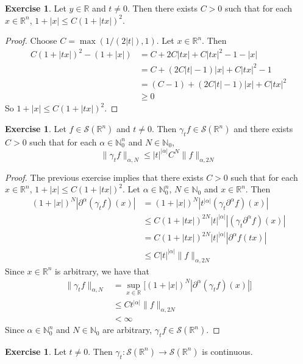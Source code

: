 \documentclass{book}
\theoremstyle{definition}
\newtheorem{ex}[definition]{Exercise}
\newcommand{\al}{\alpha}
\newcommand{\gam}{\gamma}
\newcommand{\N}{\mathbb{N}}
\newcommand{\R}{\mathbb{R}}
\newcommand{\MS}{\mathcal{S}}
\DeclareMathOperator*{\0}{\mbf{0}}
\DeclareMathOperator*{\1}{\mbf{1}}
\newcommand{\p}{\partial}
\begin{document}
	\begin{ex} Let $y \in \R$ and $t \neq 0$. Then there exists $C > 0$ such that for each $x \in \R^n$, $1+|x| \leq C(1 + |tx|)^2$.
	\end{ex}
	
	\begin{proof}
		Choose $C = \max(1/(2|t|), 1)$. Let $x \in \R^n$. Then 
		\begin{align*}
			C(1 + |tx|)^2 - (1 + |x|) 
			& = C + 2C|tx| + C|tx|^2 - 1 - |x| \\
			& = C + (2C|t| - 1)|x| + C|tx|^2 - 1 \\
			& = (C-1) + (2C|t| - 1)|x| + C|tx|^2 \\
			& \geq 0
		\end{align*}
		So $1 + |x| \leq C(1 + |tx|)^2$. 
	\end{proof}

	\begin{ex}
		Let $f \in \MS(\R^n)$ and $t \neq 0$. Then $ \gam_t f \in \MS(\R^n)$ and there exists $C > 0$ such that for each $\al \in \N_0^n$ and $N \in \N_0$, 
		$$\| \gam_t f\|_{\al, N} \leq |t|^{|\al|} C^N\|f\|_{\al, 2N}$$
	\end{ex}
	
	\begin{proof}
		The previous exercise implies that there exists $C > 0$ such that for each $x \in \R^n$, $1+|x| \leq C(1 + |tx|)^2$. Let $\al \in \N_0^n$, $N \in \N_0$ and $x \in \R^n$. Then  
		\begin{align*}
			(1+|x|)^N |\p^{\al}( \gam_t f)(x)|
			& = (1+|x|)^N |t^{|\al|} (\gam_t \p^{\al} f)(x)| \\
			& \leq C(1+|tx|)^{2N} |t|^{|\al|} |(\gam_t \p^{\al} f)(x)| \\
			& = C(1+|tx|)^{2N} |t|^{|\al|}  |\p^{\al} f(tx)| \\
			& \leq C |t|^{|\al|} \|f\|_{\al, 2N}
		\end{align*}
		Since $x \in \R^n$ is arbitrary, we have that
		\begin{align*}
			\|\gam_t f\|_{\al, N}
			& = \sup_{x \in \R} \bigg[ (1+|x|)^N |\p^{\al} (\gam_t f)(x)|\bigg] \\
			& \leq C t^{|\al|} \|f\|_{\al, 2N} \\
			& < \infty
		\end{align*}
		Since $\al \in \N_0^n$ and $N \in \N_0$ are arbitrary, $\gam_t f \in \MS(\R^n)$.
	\end{proof}
	
	\begin{ex}
		Let $t \neq 0$. Then $\gam_t: \MS(\R^n) \rightarrow \MS(\R^n)$ is continuous.
	\end{ex}
	
\end{document}
